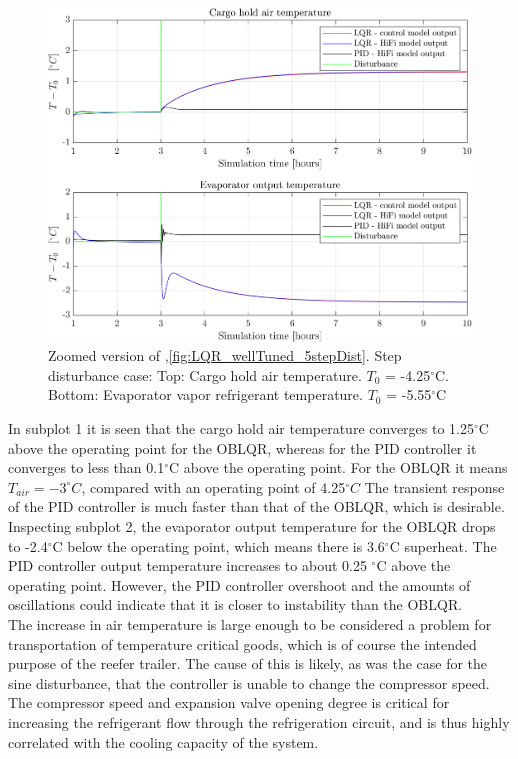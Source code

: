 \begin{figure}[H]
	\centering
	\includegraphics[width=1\textwidth]{Graphics/fig_LQRvsKresten_stepDist_zoom.png}
	\caption{Zoomed version of ,\cref{fig:LQR_wellTuned_5stepDist}. Step disturbance case: Top: Cargo hold air temperature. $T_0$ = -4.25$^{\circ}$C. Bottom: Evaporator vapor refrigerant temperature. $T_0$ = -5.55$^{\circ}$C}
	\label{fig:LQR_wellTuned_5stepDist_zoom}
\end{figure}

\noindent In subplot 1 it is seen that the cargo hold air temperature converges to 1.25$^{\circ}$C above the operating point for the OBLQR, whereas for the PID controller it converges to less than 0.1$^{\circ}$C above the operating point.
For the OBLQR it means $T_{air} = -3^{\circ}C$, compared with an operating point of 4.25$^{\circ}C$
The transient response of the PID controller is much faster than that of the OBLQR, which is desirable. 
Inspecting subplot 2, the evaporator output temperature for the OBLQR drops to -2.4$^{\circ}$C below the operating point, which means there is 3.6$^{\circ}$C superheat. The PID controller output temperature increases to about 0.25 $^{\circ}$C above the operating point.
However, the PID controller overshoot and the amounts of oscillations could indicate that it is closer to instability than the OBLQR.\\

The increase in air temperature is large enough to be considered a problem for transportation of temperature critical goods, which is of course the intended purpose of the reefer trailer. The cause of this is likely, as was the case for the sine disturbance, that the controller is unable to change the compressor speed. The compressor speed and expansion valve opening degree is critical for increasing the refrigerant flow through the refrigeration circuit, and is thus highly correlated with the cooling capacity of the system. \\


